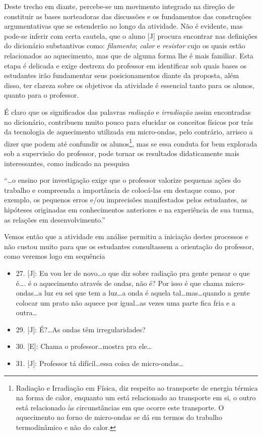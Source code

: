 Deste trecho em diante, percebe-se um movimento integrado na direção de constituir as bases norteadoras das discussões e os fundamentos das construções argumentativas que se estenderão ao longo da atividade. Não é evidente, mas pode-se inferir com certa cautela, que o aluno [J] procura encontrar nas definições do dicionário substantivos como: \emph{filamento}; \emph{calor} e \emph{resistor} cujo os quais estão relacionados ao aquecimento, mas que de alguma forma lhe é mais familiar.
Esta etapa é delicada e exige destreza do professor em identificar sob quais bases os estudantes irão fundamentar seus posicionamentos diante da proposta, além disso, ter clareza sobre os objetivos da atividade é essencial tanto para os alunos, quanto para o professor.

É claro que os significados das palavras \emph{radiação} e \emph{irradiação} assim encontradas no dicionário, contribuem muito pouco para elucidar os conceitos físicos por trás da tecnologia de aquecimento utilizada em micro-ondas, pelo contrário, arrisco a dizer que podem até confundir os alunos\footnote{Radiação e Irradiação em Física, diz respeito ao transporte de energia térmica na forma de calor, enquanto um está relacionado ao transporte em si, o outro está relacionado às circunstâncias em que ocorre este transporte. O aquecimento no forno de micro-ondas se dá em termos do trabalho termodinâmico e não do calor.}, mas se essa conduta for bem explorada sob a supervisão do professor, pode tornar os resultados didaticamente mais interessantes, como indicado na pesquisa
\begin{citacao}
    ``\ldots o ensino por investigação exige que o professor valorize pequenas ações
    do trabalho e compreenda a importância de colocá-las em destaque como, por
    exemplo, os pequenos erros e/ou imprecisões manifestados pelos estudantes, as
    hipóteses originadas em conhecimentos anteriores e na experiência de sua turma,
    as relações em desenvolvimento.'' \cite[p. ~58]{SASSERON:2015}
\end{citacao}
Vemos então que a atividade em análise permitiu a iniciação destes processos e não custou muito para que os estudantes consultassem a orientação do professor, como veremos logo em sequência
\begin{itemize}
    \item 27. [J]: Eu vou ler de novo\ldots o que diz sobre radiação pra gente pensar o que é\ldots. é o aquecimento através de ondas, não é? Por isso é que chama micro-ondas\ldots a luz eu sei que tem a luz\ldots a onda é aquela tal\ldots mas\ldots quando a gente colocar um prato não aquece por igual\ldots as vezes uma parte fica fria e a outra\ldots
    \item 29. [J]: É?\ldots As ondas têm irregularidades?
    \item 30. [E]: Chama o professor\ldots mostra pra ele\ldots
    \item 31. [J]: Professor tá difícil\ldots essa coisa de micro-ondas\ldots
\end{itemize}
